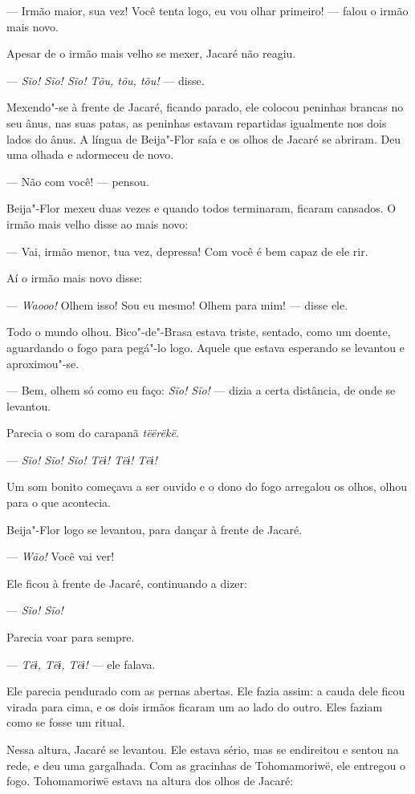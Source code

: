 --- Irmão maior, sua vez! Você tenta logo, eu vou olhar primeiro! ---
falou o irmão mais novo. 

Apesar de o irmão mais velho se mexer, Jacaré não reagiu.

--- \emph{Sĩo! Sĩo! Sĩo! Tõu, tõu, tõu!} --- disse.

Mexendo"-se à frente de Jacaré, ficando parado, ele colocou peninhas
brancas no seu ânus, nas suas patas, as peninhas estavam repartidas
igualmente nos dois lados do ânus. A língua de Beija"-Flor saía e os
olhos de Jacaré se abriram. Deu uma olhada e adormeceu de novo. 

--- Não com você! --- pensou. 

Beija"-Flor mexeu duas vezes e quando todos terminaram, ficaram cansados.
O irmão mais velho disse ao mais novo: 

--- Vai, irmão menor, tua vez, depressa! Com você é bem capaz de ele
rir.

Aí o irmão mais novo disse:

--- \emph{Waooo!} Olhem isso! Sou eu mesmo! Olhem para mim! --- disse
ele. 

Todo o mundo olhou. Bico"-de"-Brasa estava triste, sentado, como um
doente, aguardando o fogo para pegá"-lo logo. Aquele que estava esperando
se levantou e aproximou"-se. 

--- Bem, olhem só como eu faço: \emph{Sĩo! Sĩo!} --- dizia a certa
distância, de onde se levantou. 

Parecia o som do carapanã \emph{tëërëkë.}

--- \emph{Sĩo! Sĩo! Sĩo! Tëɨ! Tëɨ! Tëɨ!}

Um som bonito começava a ser ouvido e o dono do fogo arregalou os olhos,
olhou para o que acontecia.

Beija"-Flor logo se levantou, para dançar à frente de Jacaré.

--- \emph{Wão!} Você vai ver!

Ele ficou à frente de Jacaré, continuando a dizer:

--- \emph{Sĩo! Sĩo!}

Parecia voar para sempre. 

--- \emph{Tëɨ, Tëɨ, Tëɨ!} --- ele falava. 

Ele parecia pendurado com as pernas abertas. Ele fazia assim: a cauda
dele ficou virada para cima, e os dois irmãos ficaram um ao lado do
outro. Eles faziam como se fosse um ritual. 

Nessa altura, Jacaré se levantou. Ele estava sério, mas se endireitou e
sentou na rede, e deu uma gargalhada. Com as gracinhas de Tohomamoriwë,
ele entregou o fogo. Tohomamoriwë estava na altura dos olhos de Jacaré: 

